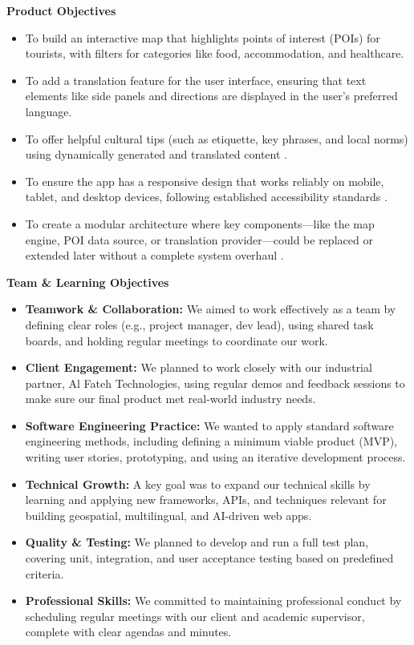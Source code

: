 \textbf{Product Objectives}
\begin{itemize}
\item To build an interactive map that highlights points of interest (POIs) for tourists, with filters for categories like food, accommodation, and healthcare.
\item To add a translation feature for the user interface, ensuring that text elements like side panels and directions are displayed in the user’s preferred language.
\item To offer helpful cultural tips (such as etiquette, key phrases, and local norms) using dynamically generated and translated content \cite{gpt_culturetips}.
\item To ensure the app has a responsive design that works reliably on mobile, tablet, and desktop devices, following established accessibility standards \cite{responsiveDesign}.
\item To create a modular architecture where key components—like the map engine, POI data source, or translation provider—could be replaced or extended later without a complete system overhaul \cite{modularApps}.
\end{itemize}

\textbf{Team \& Learning Objectives}
\begin{itemize}
\item \textbf{Teamwork \& Collaboration:} We aimed to work effectively as a team by defining clear roles (e.g., project manager, dev lead), using shared task boards, and holding regular meetings to coordinate our work.
\item \textbf{Client Engagement:} We planned to work closely with our industrial partner, Al Fateh Technologies, using regular demos and feedback sessions to make sure our final product met real-world industry needs.
\item \textbf{Software Engineering Practice:} We wanted to apply standard software engineering methods, including defining a minimum viable product (MVP), writing user stories, prototyping, and using an iterative development process.
\item \textbf{Technical Growth:} A key goal was to expand our technical skills by learning and applying new frameworks, APIs, and techniques relevant for building geospatial, multilingual, and AI-driven web apps.
\item \textbf{Quality \& Testing:} We planned to develop and run a full test plan, covering unit, integration, and user acceptance testing based on predefined criteria.
\item \textbf{Professional Skills:} We committed to maintaining professional conduct by scheduling regular meetings with our client and academic supervisor, complete with clear agendas and minutes.
\end{itemize}

